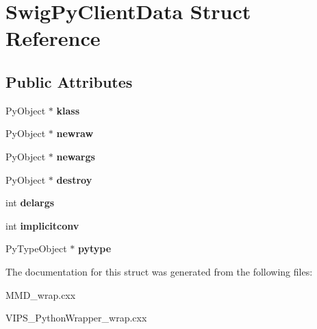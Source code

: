 \hypertarget{structSwigPyClientData}{}\section{Swig\+Py\+Client\+Data Struct Reference}
\label{structSwigPyClientData}
\subsection*{Public Attributes}
\begin{DoxyCompactItemize}
\item 
Py\+Object $\ast$ {\bfseries klass}\hypertarget{structSwigPyClientData_afe15f48c719784bf245534c4999ea387}{}\label{structSwigPyClientData_afe15f48c719784bf245534c4999ea387}

\item 
Py\+Object $\ast$ {\bfseries newraw}\hypertarget{structSwigPyClientData_aef35885524e7defa5cbcc00714c4a5c1}{}\label{structSwigPyClientData_aef35885524e7defa5cbcc00714c4a5c1}

\item 
Py\+Object $\ast$ {\bfseries newargs}\hypertarget{structSwigPyClientData_a8080712504b1249851e64d0baa3926bb}{}\label{structSwigPyClientData_a8080712504b1249851e64d0baa3926bb}

\item 
Py\+Object $\ast$ {\bfseries destroy}\hypertarget{structSwigPyClientData_a1e3e0efca34cf915f74fdd66ecb9a01e}{}\label{structSwigPyClientData_a1e3e0efca34cf915f74fdd66ecb9a01e}

\item 
int {\bfseries delargs}\hypertarget{structSwigPyClientData_a9cb4b9b02743d09dbe216f304e2b7df0}{}\label{structSwigPyClientData_a9cb4b9b02743d09dbe216f304e2b7df0}

\item 
int {\bfseries implicitconv}\hypertarget{structSwigPyClientData_a5f9ebdbc04a774559a64b926b6ec4070}{}\label{structSwigPyClientData_a5f9ebdbc04a774559a64b926b6ec4070}

\item 
Py\+Type\+Object $\ast$ {\bfseries pytype}\hypertarget{structSwigPyClientData_a489eefb474298d8b2c2e7d6d2583ca98}{}\label{structSwigPyClientData_a489eefb474298d8b2c2e7d6d2583ca98}

\end{DoxyCompactItemize}


The documentation for this struct was generated from the following files\+:\begin{DoxyCompactItemize}
\item 
M\+M\+D\+\_\+wrap.\+cxx\item 
V\+I\+P\+S\+\_\+\+Python\+Wrapper\+\_\+wrap.\+cxx\end{DoxyCompactItemize}
